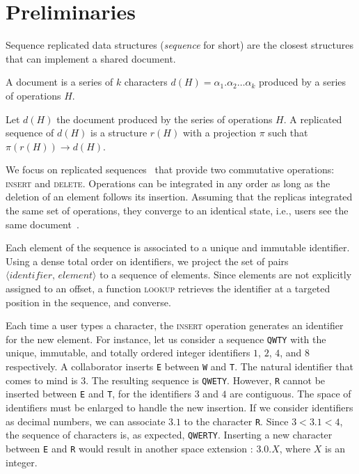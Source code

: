 
\section{Preliminaries}
\label{sec:preliminaries}

Sequence replicated data structures (\emph{sequence} for short) are the closest
structures that can implement a shared document. 

\begin{definition}[Document]
  A document is a series of $k$ characters
  $d(H) = \alpha_1.\alpha_2\ldots \alpha_k$ produced by a series of operations
  $H$.
\end{definition}

\begin{definition}
  Let $d(H)$ the document produced by the series of operations $H$. A replicated
  sequence of $d(H)$ is a structure $r(H)$ with a projection $\pi$ such that
  $\pi(r(H)) \rightarrow d(H)$.
\end{definition}

We focus on replicated sequences~\cite{shapiro2011comprehensive,
  shapiro2011conflict} that provide two commutative operations:
\textsc{insert} and \textsc{delete}. Operations can be integrated in
any order as long as the deletion of an element follows its
insertion. Assuming that the replicas integrated the same set of
operations, they converge to an identical state, i.e., users see the
same document~\cite{shapiro2011conflict}.

\noindent Each element of the sequence is associated to a unique and immutable
identifier. Using a dense total order on identifiers, we project the set of
pairs $\langle identifier,\, element \rangle$ to a sequence of elements. Since
elements are not explicitly assigned to an offset, a function \textsc{lookup}
retrieves the identifier at a targeted position in the sequence, and converse.

Each time a user types a character, the \textsc{insert} operation generates an
identifier for the new element.  For instance, let us consider a sequence
\texttt{QWTY} with the unique, immutable, and totally ordered integer
identifiers $1$, $2$, $4$, and $8$ respectively. A collaborator inserts
\texttt{E} between \texttt{W} and \texttt{T}. The natural identifier that comes
to mind is $3$. The resulting sequence is \texttt{QWETY}. However, \texttt{R}
cannot be inserted between \texttt{E} and \texttt{T}, for the identifiers $3$
and $4$ are contiguous. The space of identifiers must be enlarged to handle the
new insertion. If we consider identifiers as decimal numbers, we can associate
$3.1$ to the character \texttt{R}. Since $3 < 3.1 < 4$, the sequence of
characters is, as expected, \texttt{QWERTY}. Inserting a new character between
\texttt{E} and \texttt{R} would result in another space extension : $3.0.X$,
where $X$ is an integer.

